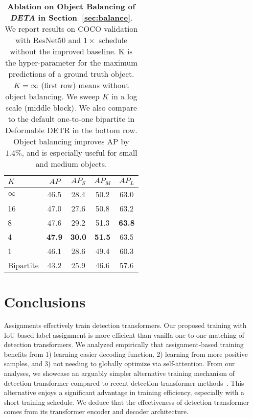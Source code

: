 \documentclass[10pt,twocolumn,letterpaper]{article}
\newcommand{\refsec}[1]{Section~\ref{sec:#1}}
\newcommand{\lbltbl}[1]{\label{tbl:#1}}
\def\name{{\textit{DETA}}\xspace}
\begin{document}
\begin{table}[!t]
\centering
\begin{tabular}{@{}l@{\ \ \ \ \ \ }c@{\ \ \ \ \ \ }c@{\ \ \ \ \ \ }c@{\ \ \ \ \ \ }c@{}}
\toprule
$K$  & $AP$ & $AP_S$ & $AP_M$ & $AP_L$\\
\midrule
$\infty$ & 46.5 & 28.4 & 50.2 & 63.0 \\
\midrule
 16 & 47.0 & 27.6 & 50.8 & 63.2 \\
  8 & 47.6 & 29.2 & 51.3 & \textbf{63.8} \\
  4 & \textbf{47.9} & \textbf{30.0} & \textbf{51.5} & 63.5 \\
  1 & 46.1 & 28.6 & 49.4 & 60.3 \\
\midrule
Bipartite  & 43.2 & 25.9 & 46.6 & 57.6 \\
\bottomrule
\end{tabular}
\caption{\textbf{Ablation on Object Balancing of \name in \refsec{balance}}.
We report results on COCO validation with ResNet50 and $1\times$ schedule without the improved baseline.
K is the hyper-parameter for the maximum predictions of a ground truth object.
$K=\infty$ (first row) means without object balancing.
We sweep $K$ in a log scale (middle block).
We also compare to the default one-to-one bipartite in Deformable DETR in the bottom row.
Object balancing improves AP by $1.4\%$, and is especially useful for small and medium objects.
}
\lbltbl{balance}
\vspace{-5mm}
\end{table}

\section{Conclusions}
Assignments effectively train detection transformers.
Our proposed training with IoU-based label assignment is more efficient than vanilla one-to-one matching of detection transformers.
We analyzed empirically that assignment-based training benefits from 1) learning easier decoding function, 2) learning from more positive samples, and 3) not needing to globally optimize via self-attention.
From our analyses, we showcase an arguably simpler alternative training mechanism of detection transformer compared to recent detection transformer methods~\cite{zhang2022dino, li2022dn}.
This alternative enjoys a significant advantage in training efficiency, especially with a short training schedule. 
We deduce that the effectiveness of detection transformer comes from its transformer encoder and decoder architecture.
\end{document}
